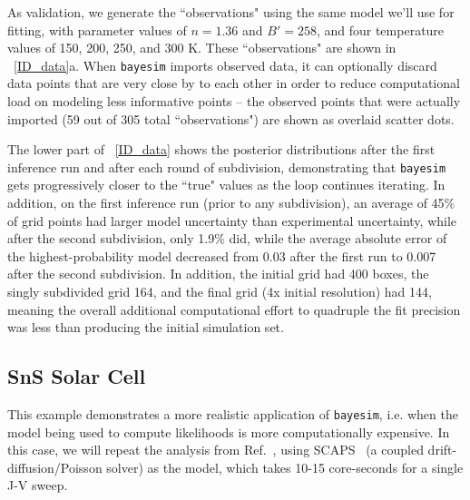 \documentclass[aps,prl,amsmath,amssymb,superscriptaddress,notitlepage,groupedaddress]{revtex4-1}
\begin{document}
    As validation, we generate the ``observations" using the same model we'll use for fitting, with parameter values of $n=1.36$ and $B'=258$, and four temperature values of 150, 200, 250, and 300 K. These ``observations" are shown in ~\autoref{ID_data}a. When \texttt{bayesim} imports observed data, it can optionally discard data points that are very close by to each other in order to reduce computational load on modeling less informative points -- the observed points that were actually imported (59 out of 305 total ``observations") are shown as overlaid scatter dots.

    The lower part of ~\autoref{ID_data} shows the posterior distributions after the first inference run and after each round of subdivision, demonstrating that \texttt{bayesim} gets progressively closer to the ``true" values as the loop continues iterating. In addition, on the first inference run (prior to any subdivision), an average of 45\% of grid points had larger model uncertainty than experimental uncertainty, while after the second subdivision, only 1.9\% did, while the average absolute error of the highest-probability model decreased from 0.03 after the first run to 0.007 after the second subdivision. In addition, the initial grid had 400 boxes, the singly subdivided grid 164, and the final grid (4x initial resolution) had 144, meaning the overall additional computational effort to quadruple the fit precision was less than producing the initial simulation set.

  \subsection{SnS Solar Cell}
    This example demonstrates a more realistic application of \texttt{bayesim}, i.e. when the model being used to compute likelihoods is more computationally expensive. In this case, we will repeat the analysis from Ref.~\cite{SnSJoule}, using SCAPS~\cite{SCAPS} (a coupled drift-diffusion/Poisson solver) as the model, which takes 10-15 core-seconds for a single J-V sweep.
\end{document}
